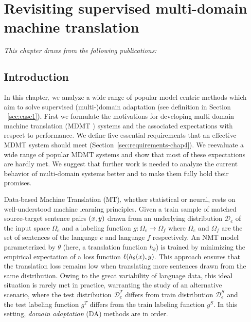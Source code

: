 \chapter{Revisiting supervised multi-domain machine translation} \label{chap:revisiting}
\textit{This chapter draws from the following publications: \citet{Pham21revisiting}}
\section{Introduction}
In this chapter, we analyze a wide range of popular model-centric methods which aim to solve supervised (multi-)domain adaptation (see definition in Section ~\ref{sec:case1}). First we formulate the motivations for developing multi-domain machine translation (MDMT ) systems and the associated expectations with respect to performance. We define five essential requirements that an effective MDMT system should meet (Section~\ref{sec:requirements-chap4}). We reevaluate a wide range of popular MDMT systems and show that most of these expectations are hardly met. We suggest that further work is needed to analyze the current behavior of multi-domain systems better and to make them fully hold their promises.

Data-based Machine Translation (MT), whether statistical or neural, rests on well-understood machine learning principles. Given a train sample of matched source-target sentence pairs $(x,y)$ drawn from an underlying distribution $\mathcal{D}_e$ of the input space $\Omega_e$ and a labeling function $g: \Omega_e \rightarrow \Omega_f$ where $\Omega_e$ and $\Omega_f$ are the set of sentences of the language $e$ and language $f$ respectively. An NMT model parameterized by $\theta$ (here, a translation function $h_{\theta}$) is trained by minimizing the empirical expectation of a loss function $\ell(h_\theta(x),y)$. This approach ensures that the translation loss remains low when translating more sentences drawn from the same distribution. Owing to the great variability of language data, this ideal situation is rarely met in practice, warranting the study of an alternative scenario, where the test distribution $\mathcal{D}_e^T$ differs from train distribution $\mathcal{D}_e^S$ and the test labeling function $g^T$ differs from the train labeling function $g^S$. In this setting, \emph{domain adaptation} (DA) methods are in order.

